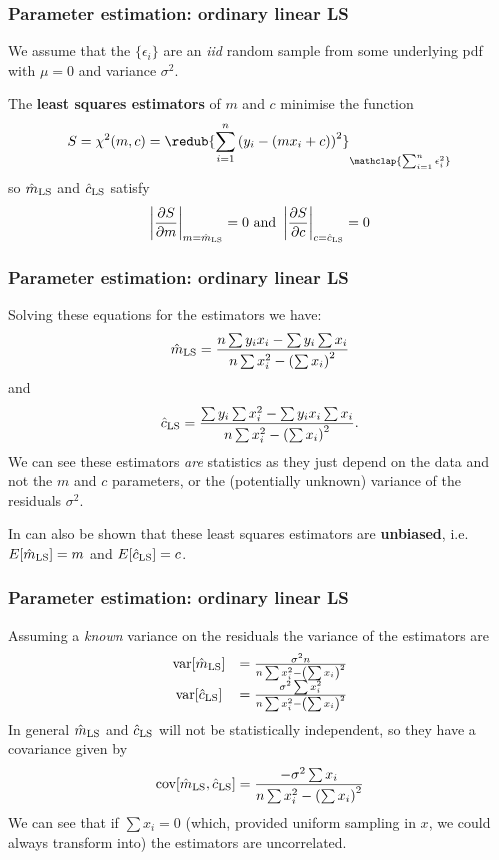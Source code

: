 \begin{frame}

\frametitle{Parameter estimation: ordinary linear LS}
\label{parameterestimation:ordinarylinearls}

We assume that the $\{\epsilon_i\}$ are an \emph{iid} random sample from some underlying pdf with
$\mu=0$ and variance $\sigma^2$.

The \textbf{least squares estimators} of $m$ and $c$ minimise the function
\[
S = \chi^2(m,c) = \redub{\sum_{i=1}^n \left(y_i - (mx_i + c)\right)^2}_{\mathclap{\sum_{i=1}^n \epsilon_i^2}}
\]
so $\hat{m}_{\rm LS}$ and $\hat{c}_{\rm LS}$ satisfy
\[
\left|\frac{\partial S}{\partial m}\right|_{m=\hat{m}_{\rm LS}} = 0 \text{ and } \left|\frac{\partial S}{\partial c}\right|_{c=\hat{c}_{\rm LS}} = 0
\]

\end{frame}

\begin{frame}

\frametitle{Parameter estimation: ordinary linear LS}
\label{parameterestimation:ordinarylinearls}

Solving these equations for the estimators we have:
\[
\hat{m}_{\rm LS} = \frac{n\sum y_ix_i - \sum y_i \sum x_i}{n\sum x_i^2 - \left(\sum x_i\right)^2}
\]
and
\[
\hat{c}_{\rm LS} = \frac{\sum y_i \sum x_i^2 - \sum y_ix_i \sum x_i}{n\sum x_i^2 - \left(\sum x_i\right)^2}.
\]
We can see these estimators \emph{are} statistics as they just depend on the data and not the $m$ and $c$ parameters,
or the (potentially unknown) variance of the residuals $\sigma^2$.

In can also be shown that these least squares estimators are \textbf{unbiased}, i.e. $E[\hat{m}_{\rm LS}] = m$ and
$E[\hat{c}_{\rm LS}] = c$.

\end{frame}

\begin{frame}

\frametitle{Parameter estimation: ordinary linear LS}
\label{parameterestimation:ordinarylinearls}

Assuming a \emph{known} variance on the residuals the variance of the estimators are
\[
\begin{array}{cl}
\text{var}[\hat{m}_{\rm LS}] &= \frac{\sigma^2n}{n\sum x_i^2 - \left(\sum x_i\right)^2} \\ 
\text{var}[\hat{c}_{\rm LS}] &= \frac{\sigma^2\sum x_i^2}{n\sum x_i^2 - \left(\sum x_i\right)^2}
\end{array}
\]
In general $\hat{m}_{\rm LS}$ and $\hat{c}_{\rm LS}$ will not be statistically independent, so they
have a covariance given by
\[
\text{cov}[\hat{m}_{\rm LS}, \hat{c}_{\rm LS}] = \frac{-\sigma^2\sum x_i}{n\sum x_i^2 - \left(\sum x_i\right)^2}
\]
We can see that if $\sum x_i=0$ (which, provided uniform sampling in $x$, we could always transform into) the estimators are uncorrelated.

\end{frame}

